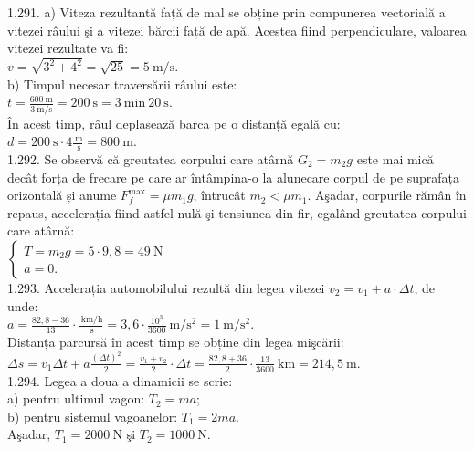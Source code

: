 1.291. a) Viteza rezultantă față de mal se obține prin compunerea vectorială a vitezei râului şi a vitezei bărcii față de apă. Acestea fiind perpendiculare, valoarea vitezei rezultate va fi:\\ $v=\sqrt{3^{2}+4^{2}}=\sqrt{25}=5 \mathrm{~m} / \mathrm{s}$.\\ b) Timpul necesar traversării râului este:\\ $t=\frac{600 \mathrm{~m}}{3 \mathrm{~m} / \mathrm{s}}=200 \mathrm{~s}=3 \mathrm{~min}\ 20 \mathrm{~s}$.\\ În acest timp, râul deplasează barca pe o distanță egală cu:\\ $d=200 \mathrm{~s} \cdot 4 \frac{\mathrm{~m}}{\mathrm{~s}}=800 \mathrm{~m}$.\\

1.292. Se observă că greutatea corpului care atârnă $G_{2}=m_{2} g$ este mai mică decât forța de frecare pe care ar întâmpina-o la alunecare corpul de pe suprafața orizontală și anume $F_{f}^{\max}=\mu m_{1} g$, întrucât $m_{2}<\mu m_{1}$. Aşadar, corpurile rămân în repaus, accelerația fiind astfel nulă şi tensiunea din fir, egalând greutatea corpului care atârnă:\\ $\left\{\begin{array}{l} T=m_{2} g=5 \cdot 9,8=49 \mathrm{~N}\\ a=0 . \end{array}\right.$\\

1.293. Accelerația automobilului rezultă din legea vitezei $v_{2}=v_{1}+a \cdot \Delta t$, de unde:\\ $a=\frac{82,8-36}{13} \cdot \frac{\mathrm{~km} / \mathrm{h}}{\mathrm{~s}}=3,6 \cdot \frac{10^{3}}{3600} \mathrm{~m} / \mathrm{s}^{2}=1 \mathrm{~m} / \mathrm{s}^{2}$.\\ Distanța parcursă în acest timp se obține din legea mişcării:\\ $\Delta s=v_{1} \Delta t+a \frac{(\Delta t)^{2}}{2}=\frac{v_{1}+v_{2}}{2} \cdot \Delta t=\frac{82,8+36}{2} \cdot \frac{13}{3600} \mathrm{~km}=214,5 \mathrm{~m}$.\\

1.294. Legea a doua a dinamicii se scrie:\\ a) pentru ultimul vagon: $T_{2}=m a$;\\ b) pentru sistemul vagoanelor: $T_{1}=2 m a$.\\ Aşadar, $T_{1}=2000 \mathrm{~N}$ şi $T_{2}=1000 \mathrm{~N}$.\\


